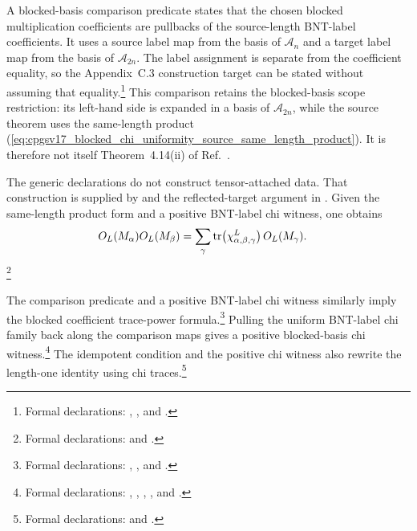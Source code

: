 \documentclass{article}
\begin{document}
A blocked-basis comparison predicate states that the chosen blocked
multiplication coefficients are pullbacks of the source-length BNT-label
coefficients. It uses a source label map from the basis of $\mathcal A_n$ and
a target label map from the basis of $\mathcal A_{2n}$. The label assignment
is separate from the coefficient equality, so the Appendix~C.3 construction
target can be stated without assuming that equality.\footnote{Formal
declarations:
,
, and
.}
This comparison retains the blocked-basis scope restriction: its left-hand
side is expanded in a basis of $\mathcal A_{2n}$, while the source theorem
uses the same-length product
(\ref{eq:cpgsv17_blocked_chi_uniformity_source_same_length_product}). It is
therefore not itself Theorem~4.14(ii) of
Ref.~\cite{Cirac2016MPDO_arXiv}.

The generic declarations do not construct tensor-attached data. That
construction is supplied by
 and the reflected-target argument
in
. Given the
same-length product form and a positive BNT-label chi witness, one obtains
\begin{align}
    O_L(M_\alpha)O_L(M_\beta)
        &= \sum_\gamma
            \operatorname{tr}\!\left(\chi_{\alpha,\beta,\gamma}^{L}\right)
            O_L(M_\gamma).
\label{eq:cpgsv17_blocked_chi_uniformity_same_length_chi_product}
\end{align}
\footnote{Formal declarations:
and
.}

The comparison predicate and a positive BNT-label chi witness similarly imply
the blocked coefficient trace-power formula.\footnote{Formal declarations:
,
,
and
.}
Pulling the uniform BNT-label chi family back along the comparison maps gives a
positive blocked-basis chi witness.\footnote{Formal declarations:
,
,
,
,
and
.}
The idempotent condition and the positive chi witness also rewrite the
length-one identity using chi traces.\footnote{Formal declarations:
and
.}
\end{document}
